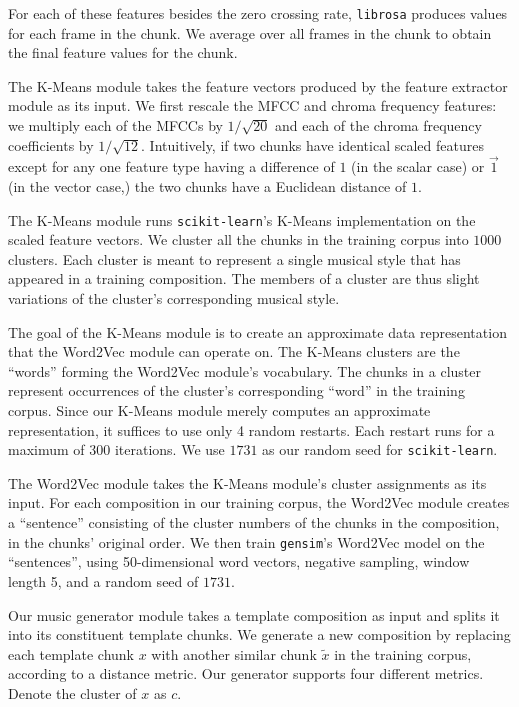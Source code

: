 \documentclass{article}
\begin{document}
For each of these features besides the zero crossing rate, \texttt{librosa} produces values for each frame in the chunk. We average over all frames in the chunk to obtain the final feature values for the chunk.

The K-Means module takes the feature vectors produced by the feature extractor module as its input. We first rescale the MFCC and chroma frequency features: we multiply each of the MFCCs by $1 / \sqrt{20}$ and each of the chroma frequency coefficients by $1 / \sqrt{12}$. Intuitively, if two chunks have identical scaled features except for any one feature type having a difference of $1$ (in the scalar case) or $\vec{1}$ (in the vector case,) the two chunks have a Euclidean distance of $1$.

The K-Means module runs \texttt{scikit-learn}'s K-Means implementation on the scaled feature vectors. We cluster all the chunks in the training corpus into $1000$ clusters. Each cluster is meant to represent a single musical style that has appeared in a training composition. The members of a cluster are thus slight variations of the cluster's corresponding musical style.

The goal of the K-Means module is to create an approximate data representation that the Word2Vec module can operate on. The K-Means clusters are the ``words'' forming the Word2Vec module's vocabulary. The chunks in a cluster represent occurrences of the cluster's corresponding ``word'' in the training corpus. Since our K-Means module merely computes an approximate representation, it suffices to use only 4 random restarts. Each restart runs for a maximum of 300 iterations. We use $1731$ as our random seed for \texttt{scikit-learn}.

The Word2Vec module takes the K-Means module's cluster assignments as its input. For each composition in our training corpus, the Word2Vec module creates a ``sentence'' consisting of the cluster numbers of the chunks in the composition, in the chunks' original order. We then train \texttt{gensim}'s Word2Vec model on the ``sentences'', using 50-dimensional word vectors, negative sampling, window length 5, and a random seed of $1731$.

Our music generator module takes a template composition as input and splits it into its constituent template chunks. We generate a new composition by replacing each template chunk $x$ with another similar chunk $\tilde{x}$ in the training corpus, according to a distance metric. Our generator supports four different metrics. Denote the cluster of $x$ as $c$.
\end{document}
